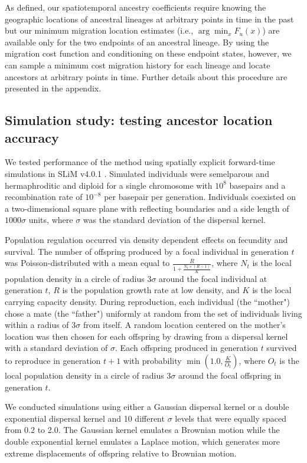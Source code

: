 As defined, our spatiotemporal ancestry coefficients require knowing the geographic
locations of ancestral lineages at arbitrary points in time in the past but our
minimum migration location estimates (i.e., $\arg\min_x F_u(x)$) are available
only for the two endpoints of an ancestral lineage. By using the migration cost
function and conditioning on these endpoint states, however, we can sample a
minimum cost migration history for each lineage and locate ancestors at
arbitrary points in time. Further details about this procedure are presented in
the appendix.


\subsection{Simulation study: testing ancestor location accuracy}

We tested performance of the method using spatially explicit forward-time 
simulations in SLiM v4.0.1 \citep{Haller_Messer_2023}. Simulated individuals
were semelparous and hermaphroditic and diploid for a single chromosome with 
$10^8$ basepairs and a recombination rate of $10^{-8}$ per basepair per
generation. Individuals coexisted on a two-dimensional square plane with
reflecting boundaries and a side length of $1000\sigma$ units, where $\sigma$ 
was the standard deviation of the dispersal kernel.

Population regulation occurred via density dependent effects on fecundity and
survival. The number of offspring produced by a focal individual in generation
$t$ was Poisson-distributed with a mean equal to 
$\frac{R}{1 + \frac{N_t \times (R-1)}{K}}$,
where $N_t$ is the local population density in a circle of radius $3\sigma$ 
around the focal individual at generation $t$, $R$ is the population growth 
rate at low density, and $K$ is the local carrying capacity density. During 
reproduction, each individual (the ``mother") chose a mate (the ``father") 
uniformly at random from the set of individuals living within a radius of 
$3\sigma$ from itself. A random location centered on the mother's location was 
then chosen for each offspring by drawing from a dispersal kernel with a 
standard deviation of $\sigma$. Each offspring produced in generation $t$ 
survived to reproduce in generation $t+1$ with probability 
$\min(1.0, \frac{K}{O_t})$, where $O_t$ is the local population density in a 
circle of radius $3\sigma$ around the focal offspring in generation $t$.

We conducted simulations using either a Gaussian dispersal kernel or a double
exponential dispersal kernel and 10 different $\sigma$ levels that were equally
spaced from 0.2 to 2.0. The Gaussian kernel emulates a Brownian motion while
the double exponential kernel emulates a Laplace motion, which generates more
extreme displacements of offspring relative to Brownian motion.

